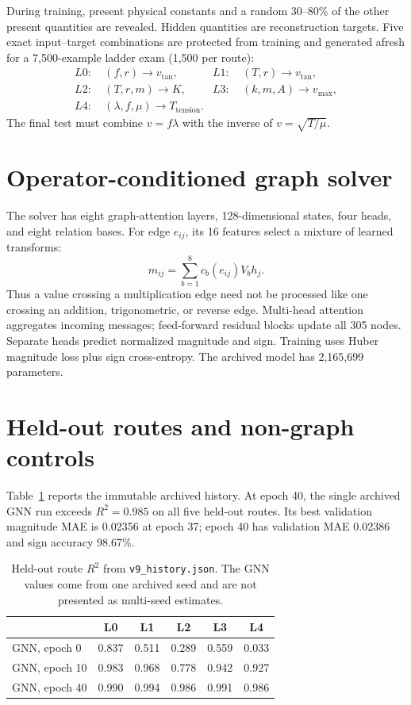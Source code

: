 \documentclass[10pt]{article}
\begin{document}
During training, present physical constants and a random 30--80\% of the other present quantities are revealed. Hidden quantities are reconstruction targets. Five exact input--target combinations are protected from training and generated afresh for a 7,500-example ladder exam (1,500 per route):
\begin{align*}
L0:&\ (f,r)\rightarrow v_{\tan},&
L1:&\ (T,r)\rightarrow v_{\tan},\\
L2:&\ (T,r,m)\rightarrow K,&
L3:&\ (k,m,A)\rightarrow v_{\max},\\
L4:&\ (\lambda,f,\mu)\rightarrow T_{\mathrm{tension}}.&
\end{align*}
The final test must combine $v=f\lambda$ with the inverse of $v=\sqrt{T/\mu}$.

\section{Operator-conditioned graph solver}

The solver has eight graph-attention layers, 128-dimensional states, four heads, and eight relation bases. For edge $e_{ij}$, its 16 features select a mixture of learned transforms:
\begin{equation}
 m_{ij}=\sum_{b=1}^{8}c_b(e_{ij})V_bh_j .
 \label{eq:message}
\end{equation}
Thus a value crossing a multiplication edge need not be processed like one crossing an addition, trigonometric, or reverse edge. Multi-head attention aggregates incoming messages; feed-forward residual blocks update all 305 nodes. Separate heads predict normalized magnitude and sign. Training uses Huber magnitude loss plus sign cross-entropy. The archived model has 2,165,699 parameters.

\section{Held-out routes and non-graph controls}

Table~\ref{tab:ladder} reports the immutable archived history. At epoch 40, the single archived GNN run exceeds $R^2=0.985$ on all five held-out routes. Its best validation magnitude MAE is 0.02356 at epoch 37; epoch 40 has validation MAE 0.02386 and sign accuracy 98.67\%.

\begin{table}[H]
\centering\small
\begin{tabular}{lccccc}
\toprule
 & L0 & L1 & L2 & L3 & L4\\
\midrule
GNN, epoch 0  & 0.837 & 0.511 & 0.289 & 0.559 & 0.033\\
GNN, epoch 10 & 0.983 & 0.968 & 0.778 & 0.942 & 0.927\\
GNN, epoch 40 & 0.990 & 0.994 & 0.986 & 0.991 & 0.986\\
\bottomrule
\end{tabular}
\caption{Held-out route $R^2$ from \texttt{v9\_history.json}. The GNN values come from one archived seed and are not presented as multi-seed estimates.}
\label{tab:ladder}
\end{table}
\end{document}
